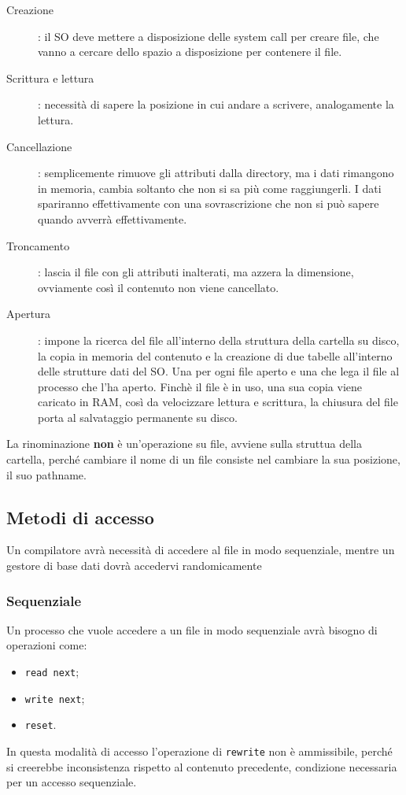 \documentclass[a4paper, 12pt]{book}
\begin{document}
\begin{description}
    \item[Creazione]: il SO deve mettere a disposizione delle 
    system call per creare file, che vanno a cercare dello 
    spazio a disposizione per contenere il file.
    \item[Scrittura e lettura]: necessità di sapere la 
    posizione in cui andare a scrivere, analogamente la 
    lettura.
    \item[Cancellazione]: semplicemente rimuove gli 
    attributi dalla directory, ma i dati rimangono in memoria,
    cambia soltanto che non si sa più come raggiungerli.
    I dati spariranno effettivamente con una sovrascrizione
    che non si può sapere quando avverrà effettivamente.
    \item[Troncamento]: lascia il file con gli attributi 
    inalterati, ma azzera la dimensione, ovviamente così 
    il contenuto non viene cancellato.
    \item[Apertura]: impone la ricerca del file all'interno
    della struttura della cartella su disco, la copia in memoria 
    del contenuto e la creazione di due tabelle all'interno 
    delle strutture dati del SO. Una per ogni file aperto 
    e una che lega il file al processo che l'ha aperto.
    Finchè il file è in uso, una sua copia viene 
    caricato in RAM, così da velocizzare lettura e scrittura, 
    la chiusura del file porta al salvataggio permanente 
    su disco.
\end{description}
La rinominazione \textbf{non} è un'operazione su file, 
avviene sulla struttua della cartella, perché cambiare il 
nome di un file consiste nel cambiare la sua posizione, 
il suo pathname.

\subsection{Metodi di accesso}

Un compilatore avrà necessità di accedere al file in modo 
sequenziale, mentre un gestore di base dati dovrà accedervi 
randomicamente

\subsubsection{Sequenziale}

Un processo che vuole accedere a un file in modo sequenziale 
avrà bisogno di operazioni come:
\begin{itemize}
    \item \verb|read next|;
    \item \verb|write next|;
    \item \verb|reset|.
\end{itemize}
In questa modalità di accesso l'operazione di \verb|rewrite| 
non è ammissibile, perché si creerebbe inconsistenza rispetto 
al contenuto precedente, condizione necessaria per un accesso
sequenziale.
\end{document}
